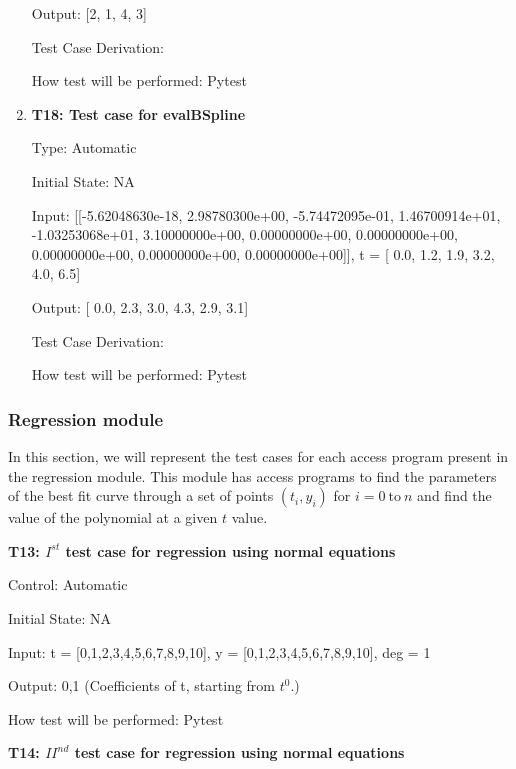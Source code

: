 \documentclass[12pt, titlepage]{article}
\begin{document}
\begin{enumerate}
Output: [2, 1, 4, 3]

Test Case Derivation: \cite{HermiteCubic2}

How test will be performed: Pytest

\item{\textbf{T18: Test case for evalBSpline}}

Type: Automatic

Initial State: NA 

Input: [[-5.62048630e-18, 2.98780300e+00, -5.74472095e-01,  1.46700914e+01,
-1.03253068e+01,  3.10000000e+00,  0.00000000e+00,  0.00000000e+00,
0.00000000e+00,  0.00000000e+00,  0.00000000e+00]], t = [ 0.0, 1.2,  1.9,  
3.2,  4.0,  6.5] 

Output: [ 0.0,  2.3,  3.0,  4.3,  2.9,  3.1]

Test Case Derivation: \cite{BSpline}

How test will be performed: Pytest


\end{enumerate}

\subsubsection{Regression module}

In this section, we will represent the test cases for each access program 
present in the regression module. This module has access programs to find 
the parameters of the best fit curve through a set of points $(t_i,y_i)$ 
for $i = 0\ \text{to}\ n$ and find the value of the polynomial at a given $t$ 
value.

\item{\textbf{T13: $I^{st}$ test case for regression using normal equations} \\}

Control: Automatic

Initial State: NA

Input: t = [0,1,2,3,4,5,6,7,8,9,10], y = [0,1,2,3,4,5,6,7,8,9,10], deg = 1 

Output: 0,1 (Coefficients of t, starting from $t^{0}$.)

How test will be performed: Pytest\\


\item{\textbf{T14: ${II}^{nd}$ test case for regression using normal 
equations}\\}
\end{document}
